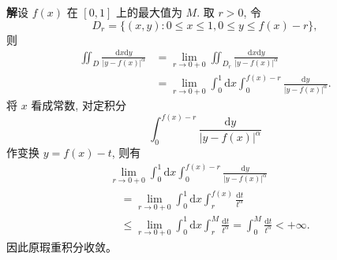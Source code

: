 \documentclass[UTF8,12pt,a4paper,fontset=fandol]{ctexart}
\begin{document}
\noindent\textbf{解}\quad 设 $f(x)$ 在 $[0,1]$ 上的最大值为 $M$. 取 $r>0$, 令
\[
  D_r=\{(x,y):0\leqslant x\leqslant1,0\leqslant y\leqslant f(x)-r\},
\]
则
\[
\begin{aligned}
  \iint_D\frac{\mathrm dx\mathrm dy}{|y-f(x)|^\alpha}
  &=\lim_{r\to0+0}\iint_{D_r}\frac{\mathrm dx\mathrm dy}{|y-f(x)|^\alpha}\\
  &=\lim_{r\to0+0}\int_0^1\mathrm dx\int_0^{f(x)-r}
  \frac{\mathrm dy}{|y-f(x)|^\alpha}.
\end{aligned}
\]
将 $x$ 看成常数, 对定积分
\[
  \int_0^{f(x)-r}\frac{\mathrm dy}{|y-f(x)|^\alpha}
\]
作变换 $y=f(x)-t$, 则有
\[
\begin{aligned}
  &\lim_{r\to0+0}\int_0^1\mathrm dx\int_0^{f(x)-r}
  \frac{\mathrm dy}{|y-f(x)|^\alpha}\\
  &\quad=\lim_{r\to0+0}\int_0^1\mathrm dx\int_r^{f(x)}\frac{\mathrm dt}{t^\alpha}\\
  &\quad\leqslant\lim_{r\to0+0}\int_0^1\mathrm dx\int_r^M\frac{\mathrm dt}{t^\alpha}
  =\int_0^M\frac{\mathrm dt}{t^\alpha}<+\infty.
\end{aligned}
\]
因此原瑕重积分收敛。
\end{document}
